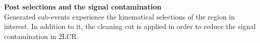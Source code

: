 \noindent \textbf{Post selections and the signal contamination} \\
Generated sub-events experience the kinematical selections of the region in interest.
In addition to it, the cleaning cut is applied in order to reduce the signal contamination in 2LCR. 
% 



